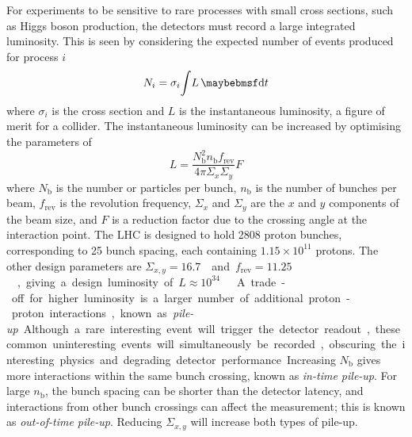 For experiments to be sensitive to rare processes with small cross sections, such as Higgs 
boson production, the detectors must record a large integrated luminosity. This is seen by 
considering the expected number of events produced for process $i$
\begin{equation}
	N_i = \sigma_i \! \int \! L \, \d{t}
	\label{eq:event_rate}
\end{equation}
where $\sigma_i$ is the cross section and $L$ is the instantaneous luminosity, a figure of 
merit for a collider. The instantaneous luminosity can be increased by optimising the
parameters of
\begin{equation}
	L = \frac{N_{\text{b}}^2 n_{\text{b}} f_{\text{rev}}}{4\pi \varSigma_x \varSigma_y} F
	\label{eq:lumi_beam}
\end{equation}
where $N_{\text{b}}$ is the number or particles per bunch, $n_{\text{b}}$ is the number of 
bunches per beam, $f_{\text{rev}}$ is the revolution frequency, $\varSigma_x$ and 
$\varSigma_y$ are the $x$ and $y$ components of the beam size, and $F$ is a reduction 
factor due to the crossing angle at the interaction point. The LHC is designed to 
hold 2808 proton bunches, corresponding to \unit{25}{\nano\second} bunch spacing, each 
containing $1.15\times10^{11}$ protons. The other design parameters are 
\unit{$\varSigma_{x,y} = 16.7$}{\micro\metre} and \unit{$f_{\text{rev}} = 11.25$}{\kHz}, 
giving a design luminosity of \unit{$L \approx 10^{34}$}{\lumiunits} \cite{LHC}.

A trade-off for higher luminosity is a larger number of additional proton-proton 
interactions, known as \textit{pile-up}. Although a rare interesting event will trigger 
the detector readout, these common uninteresting events will simultaneously be recorded, 
obscuring the interesting physics and degrading detector performance. Increasing 
$N_{\text{b}}$ gives more interactions within the same bunch crossing, known as 
\textit{in-time pile-up}. For large $n_{\text{b}}$, the bunch spacing can be shorter than 
the detector latency, and interactions from other bunch crossings can affect the 
measurement; this is known as \textit{out-of-time pile-up}. Reducing $\varSigma_{x,y}$ 
will increase both types of pile-up.
